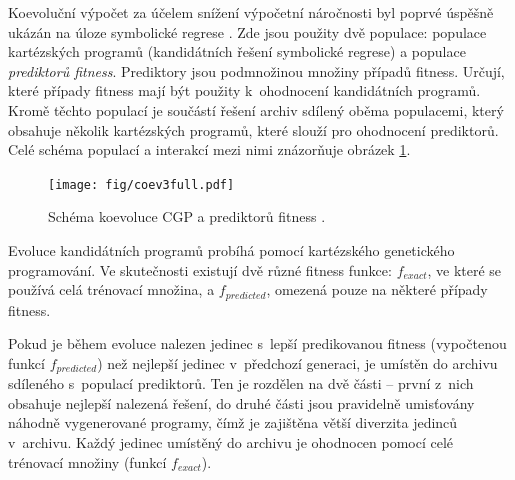 Koevoluční výpočet za účelem snížení výpočetní náročnosti byl poprvé úspěšně ukázán na úloze symbolické regrese \cite{SikuEuroGP}. Zde jsou použity dvě populace: populace kartézských programů (kandidátních řešení symbolické regrese) a populace \emph{prediktorů fitness}. Prediktory jsou podmnožinou množiny případů fitness. Určují, které případy fitness mají být použity k~ohodnocení kandidátních programů. Kromě těchto populací je součástí řešení archiv sdílený oběma populacemi, který obsahuje několik kartézských programů, které slouží pro ohodnocení prediktorů. Celé schéma populací a interakcí mezi nimi znázorňuje obrázek \ref{obrKoevoluce}.

\begin{figure}[htb]
    \baselineskip
    \centering\texttt{[image: fig/coev3full.pdf]}
    \caption{Schéma koevoluce CGP a prediktorů fitness \cite{SikuEuroGP}.}
    \label{obrKoevoluce}
\end{figure}

Evoluce kandidátních programů probíhá pomocí kartézského genetického programování. Ve skutečnosti existují dvě různé fitness funkce: $f_{\mathit{exact}}$, ve které se používá celá trénovací množina, a $f_{\mathit{predicted}}$, omezená pouze na některé případy fitness.




Pokud je během evoluce nalezen jedinec s~lepší predikovanou fitness (vypočtenou funkcí $f_{\mathit{predicted}}$) než nejlepší jedinec v~předchozí generaci, je umístěn do archivu sdíleného s~populací prediktorů. Ten je rozdělen na dvě části -- první z~nich obsahuje nejlepší nalezená řešení, do druhé části jsou pravidelně umisťovány náhodně vygenerované programy, čímž je zajištěna větší diverzita jedinců v~archivu. Každý jedinec umístěný do archivu je ohodnocen pomocí celé trénovací množiny (funkcí $f_{\mathit{exact}}$).

